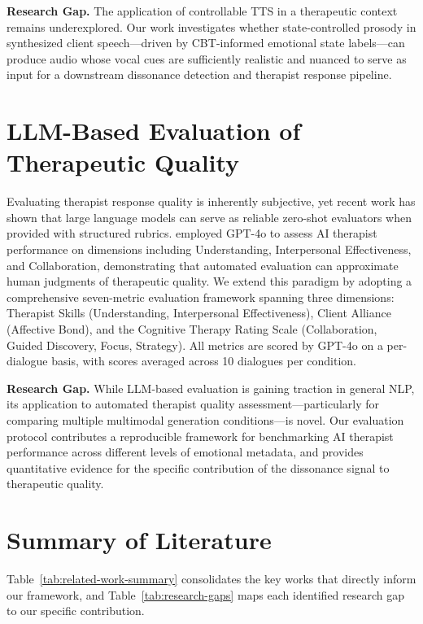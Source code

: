 \textbf{Research Gap.} The application of controllable TTS in a therapeutic context remains underexplored. Our work investigates whether state-controlled prosody in synthesized client speech---driven by CBT-informed emotional state labels---can produce audio whose vocal cues are sufficiently realistic and nuanced to serve as input for a downstream dissonance detection and therapist response pipeline.

\section{LLM-Based Evaluation of Therapeutic Quality}

Evaluating therapist response quality is inherently subjective, yet recent work has shown that large language models can serve as reliable zero-shot evaluators when provided with structured rubrics. \cite{kim-etal-2025-mirror} employed GPT-4o to assess AI therapist performance on dimensions including Understanding, Interpersonal Effectiveness, and Collaboration, demonstrating that automated evaluation can approximate human judgments of therapeutic quality. We extend this paradigm by adopting a comprehensive seven-metric evaluation framework spanning three dimensions: Therapist Skills (Understanding, Interpersonal Effectiveness), Client Alliance (Affective Bond), and the Cognitive Therapy Rating Scale (Collaboration, Guided Discovery, Focus, Strategy). All metrics are scored by GPT-4o on a per-dialogue basis, with scores averaged across 10 dialogues per condition.

\textbf{Research Gap.} While LLM-based evaluation is gaining traction in general NLP, its application to automated therapist quality assessment---particularly for comparing multiple multimodal generation conditions---is novel. Our evaluation protocol contributes a reproducible framework for benchmarking AI therapist performance across different levels of emotional metadata, and provides quantitative evidence for the specific contribution of the dissonance signal to therapeutic quality.


\section{Summary of Literature}

Table~\ref{tab:related-work-summary} consolidates the key works that directly inform our framework, and Table~\ref{tab:research-gaps} maps each identified research gap to our specific contribution.

